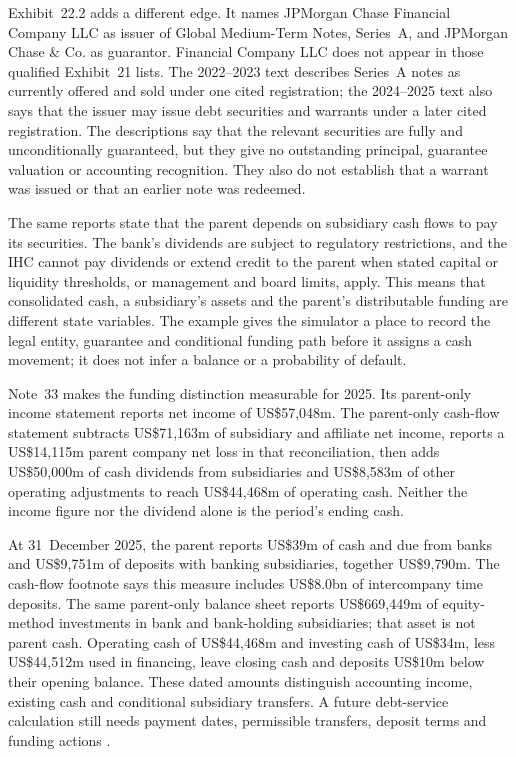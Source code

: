 Exhibit~22.2 adds a different edge. It names JPMorgan Chase Financial Company
LLC as issuer of Global Medium-Term Notes, Series~A, and JPMorgan Chase \& Co.
as guarantor. Financial Company LLC does not appear in those qualified
Exhibit~21 lists. The 2022--2023 text describes Series~A notes as currently
offered and sold under one cited registration; the 2024--2025 text also says
that the issuer may issue debt securities and warrants under a later cited
registration. The descriptions say that the relevant securities are fully and
unconditionally guaranteed, but they give no outstanding principal, guarantee
valuation or accounting recognition. They also do not establish that a warrant
was issued or that an earlier note was redeemed.

The same reports state that the parent depends on subsidiary cash flows to pay
its securities. The bank's dividends are subject to regulatory restrictions,
and the IHC cannot pay dividends or extend credit to the parent when stated
capital or liquidity thresholds, or management and board limits, apply. This
means that consolidated cash, a subsidiary's assets and the parent's
distributable funding are different state variables. The example gives the
simulator a place to record the legal entity, guarantee and conditional funding
path before it assigns a cash movement; it does not infer a balance or a
probability of default.

Note~33 makes the funding distinction measurable for 2025. Its parent-only
income statement reports net income of US\$57{,}048m. The parent-only cash-flow
statement subtracts US\$71{,}163m of subsidiary and affiliate net income,
reports a US\$14{,}115m parent company net loss in that reconciliation, then
adds US\$50{,}000m of cash dividends from subsidiaries and US\$8{,}583m of
other operating adjustments to reach US\$44{,}468m of operating cash. Neither
the income figure nor the dividend alone is the period's ending cash.

At 31~December 2025, the parent reports US\$39m of cash and due from banks and
US\$9{,}751m of deposits with banking subsidiaries, together US\$9{,}790m.
The cash-flow footnote says this measure includes US\$8.0bn of intercompany
time deposits. The same parent-only balance sheet reports US\$669{,}449m of
equity-method investments in bank and bank-holding subsidiaries; that asset is
not parent cash. Operating cash of US\$44{,}468m and investing cash of
US\$34m, less US\$44{,}512m used in financing, leave closing cash and
deposits US\$10m below their opening balance.
These dated amounts distinguish accounting income, existing cash and
conditional subsidiary transfers. A future debt-service calculation still
needs payment dates, permissible transfers, deposit terms and funding actions
\citep[pp.~19, 310--311]{jpmorgan2025tenk}.

